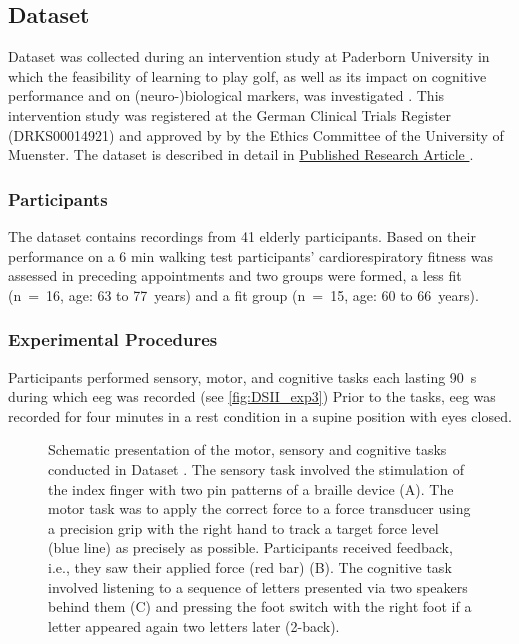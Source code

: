 \subsection{Dataset }
\label{methods:datasets:III}
Dataset  was collected during an intervention study at Paderborn University in which the feasibility of learning to play golf, as well as its impact on cognitive performance and on (neuro-)biological markers, was investigated \cite{Ströhlein2020,Stroehlein2021,Gowik2023}. This intervention study was registered at the German Clinical Trials Register (DRKS00014921) and approved by by the Ethics Committee of the University of Muenster. The dataset is described in detail in \hyperref[pub:paperIII]{Published Research Article }. 

\subsubsection{Participants}
\label{methods:datasets:III:participants}
The dataset contains recordings from 41 elderly participants. Based on their performance on a 6 min walking test participants’ cardiorespiratory fitness was assessed in preceding appointments and two groups were formed, a less fit (n~=~16, age: 63 to 77~years) and a fit group (n~=~15, age: 60 to 66~years).

\subsubsection{Experimental Procedures}
\label{methods:datasets:III:experiment}
Participants performed sensory, motor, and cognitive tasks each lasting 90~s during which \gls{eeg} was recorded (see \autoref{fig:DSII_exp3}) Prior to the tasks, \gls{eeg} was recorded for four minutes in a rest condition in a supine position with eyes closed.

\begin{figure}[h]
\begin{center}

\captionsetup{justification=justified}
\caption[Schematic presentation of the motor, sensory and cognitive tasks conducted in Dataset .]{Schematic presentation of the motor, sensory and cognitive tasks conducted in Dataset . The sensory task involved the stimulation of the index finger with two pin patterns of a braille device (A). The motor task was to apply the correct force to a force transducer using a precision grip with the right hand to track a target force level (blue line) as precisely as possible. Participants received feedback, i.e., they saw their applied force (red bar) (B). The cognitive task involved listening to a sequence of letters presented via two speakers behind them (C) and pressing the foot switch with the right foot if a letter appeared again two letters later (2-back).}
\label{fig:DSII_exp3}
\end{center}
\end{figure}

